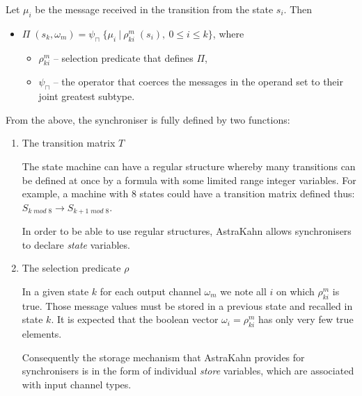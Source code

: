 \documentclass{article}
\begin{document}
Let $\mu_{i}$ be the message received in the transition from the state $s_{i}$. Then
  \begin{itemize}
  \item[] $\Pi \; (s_{k}, \omega_{m}) = \psi_{\sqcap} \; \{\mu_{i} \: | \: \rho_{ki}^{m} \; (s_{i}), \: 0 \le i \le k\}$, where
    \begin{itemize}
      \item[] $\rho_{ki}^{m}$ -- selection predicate that defines $\Pi$,
      \item[] $\psi_{\sqcap}$ -- the operator that coerces the messages in the operand set to their joint greatest subtype.
    \end{itemize}
  \end{itemize}

From the above, the synchroniser is fully defined by two functions:
  \begin{enumerate}
  \item The transition matrix $T$

The state machine can have a regular structure whereby many transitions can be defined at once by a formula with some limited range integer variables. For example, a machine with 8 states could have a transition matrix defined thus: $S_{k \; mod \; 8} \to S_{k+1 \; mod \; 8}$.

In order to be able to use regular structures, AstraKahn allows synchronisers to declare \emph{state} variables.
  \item The selection predicate $\rho$

In a given state $k$ for each output channel $\omega_{m}$ we note all $i$ on which $\rho_{ki}^{m}$ is true. Those message values must be stored in a previous state and recalled in state $k$. It is expected that the boolean vector $\omega_{i} = \rho_{ki}^{m}$ has only very few true elements.

Consequently the storage mechanism that AstraKahn provides for synchronisers is in the form of individual \emph{store} variables, which are associated with input channel types.
  \end{enumerate}
\end{document}
